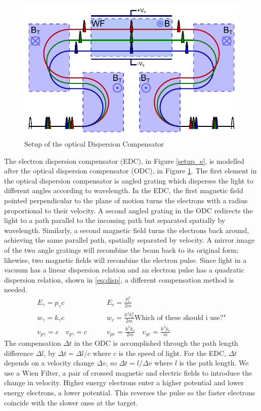 \documentclass[12pt,letterpaper]{article}
\begin{document}
\begin{figure}[tb]
   \centering
   \includegraphics[width=15cm]{Setup}
   \caption{Setup of the optical Dispersion Compensator}
   \label{setup_o}
\end{figure}

The electron dispersion compensator (EDC), in Figure \ref{setup_e}, is modelled after the optical dispersion compensator (ODC), in Figure \ref{setup_o}.  The first element in the optical dispersion compensator is angled grating which disperses the light to different angles according to wavelength.  In the EDC, the first magnetic field pointed perpendicular to the plane of motion turns the electrons with a radius proportional to their velocity. A second angled grating in the ODC redirects the light to a path parallel to the incoming path but separated spatially by wavelength. Similarly, a second magnetic field turns the electrons back around, achieving the same parallel path, spatially separated by velocity. A mirror image of the two angle gratings will recombine the beam back to its original form; likewise, two magnetic fields will recombine the electron pulse. Since light in a vacuum has a linear dispersion relation and an electron pulse has a quadratic dispersion relation, shown in \eqref{eq:disp}, a different compensation method is needed. 
\begin{align}
   \label{eq:disp}
E_\gamma=p_\gamma c &\qquad E_e=\frac{p_e^2}{2m}\\ 
w_\gamma =k_\gamma c &\qquad  w_e =\frac{\hbar^2 k_e^2}{2m} \text{Which of these should i use?"} \nonumber \\
v_{p\gamma} =c \quad v_{g\gamma}=c &\qquad  v_{pe} = \frac{\hbar^2 k_e}{2m} \quad v_{ge} = \frac{\hbar^2 k_e}{m} \nonumber
\end{align}
The compensation $\Delta t$ in the ODC is accomplished through the path length difference $\Delta l$, by $\Delta t=\Delta l/c$ where $c$ is the speed of light. For the EDC, $\Delta t$ depends on a velocity change $\Delta v$, so $\Delta t = l/\Delta v$ where $l$ is the path length. We use a Wien Filter, a pair of crossed magnetic and electric fields to introduce the change in velocity. Higher energy electrons enter a higher potential and lower energy electrons, a lower potential. This reverses the pulse so the faster electrons coincide with the slower ones at the target.  
\end{document}
